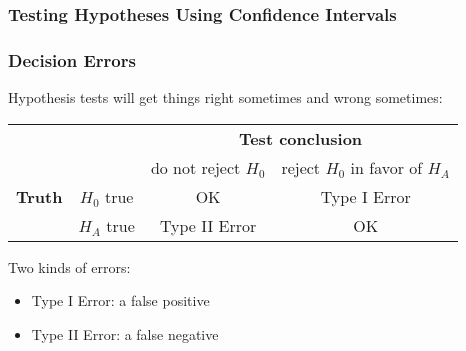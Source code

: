 \documentclass[handout]{beamer}
\newcommand{\blue}[1]{\textcolor{blue2}{#1}}
\begin{document}
\begin{frame}
\frametitle{Testing Hypotheses Using Confidence Intervals}

%
%
%
%

\end{frame}


\begin{frame}
\frametitle{Decision Errors}

%
%
Hypothesis tests will get things right sometimes and wrong sometimes:
\pause \begin{center}
  \begin{tabular}{cc|cc}
     \multicolumn{2}{c}{}  & \multicolumn{2}{c}{\textbf{Test conclusion}} \\ 
     &  & do not reject $H_0$ & reject $H_0$ in favor of $H_A$ \\ 
\hline
    \textbf{Truth} & $H_0$ true & OK & \blue{Type I Error} \\ 
     & $H_A$ true & \blue{Type II Error} & OK \\ 
    \hline
  \end{tabular}
\end{center}

\vspace{0.25cm}

\pause Two kinds of errors:
\begin{itemize}
\item \blue{Type I Error}: a false positive
\item \blue{Type II Error}: a false negative
\end{itemize}

\end{frame}
\end{document}
